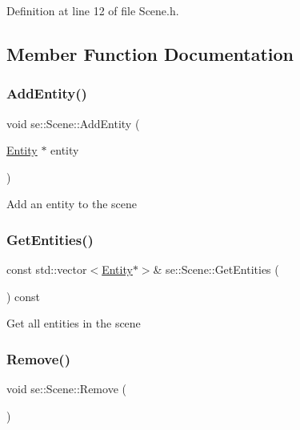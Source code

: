 Definition at line 12 of file Scene.\+h.



\subsection{Member Function Documentation}
\mbox{\label{classse_1_1_scene_a21dde7d731d672d4c424397850864549}} 
\subsubsection{\texorpdfstring{Add\+Entity()}{AddEntity()}}
{\footnotesize\ttfamily void se\+::\+Scene\+::\+Add\+Entity (\begin{DoxyParamCaption}\item[{\mbox{\hyperlink{classse_1_1_entity}{Entity}} $\ast$}]{entity }\end{DoxyParamCaption})}

Add an entity to the scene \mbox{\label{classse_1_1_scene_a1c3f1fc4ab110f9caab190cce13c2e03}} 
\subsubsection{\texorpdfstring{Get\+Entities()}{GetEntities()}}
{\footnotesize\ttfamily const std\+::vector$<$\mbox{\hyperlink{classse_1_1_entity}{Entity}}$\ast$$>$\& se\+::\+Scene\+::\+Get\+Entities (\begin{DoxyParamCaption}{ }\end{DoxyParamCaption}) const}

Get all entities in the scene \mbox{\label{classse_1_1_scene_a73f7789f2585e65174380be509b88435}} 
\subsubsection{\texorpdfstring{Remove()}{Remove()}}
{\footnotesize\ttfamily void se\+::\+Scene\+::\+Remove (\begin{DoxyParamCaption}{ }\end{DoxyParamCaption})}

